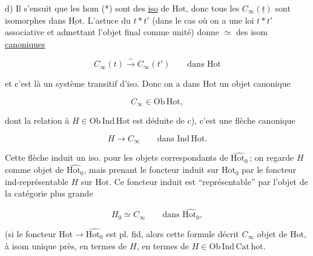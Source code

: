 
d) Il s'ensuit que les hom (*) sont des \uline{iso} de $\mathrm{Hot}$, donc tous les $C_\infty(\underline t)$ sont isomorphes dans $\underline{\mathrm{Hot}}$. L'astuce du $t*t'$ (dans le cas où on a une loi $t*t'$ associative et admettant l'objet final comme  unité) donne $\simeq$ des isom \uline{canoniques}

\[
C_\infty(t)\xrightarrow{\sim} C_\infty(t')\qquad\text{dans }\mathrm{Hot}
\]

et c'est là un système transitif d'iso. Donc on a dans $\mathrm{Hot}$ un objet  canonique

\[
C_\infty\in\mathrm{Ob}\,\mathrm{Hot},
\]

dont la relation à $H\in\mathrm{Ob}\,\mathrm{Ind\,Hot}$ est déduite de c), c'est une flèche canonique

\[
H\longrightarrow C_\infty\qquad\text{dans }\mathrm{Ind\,Hot}.
\]


Cette flèche induit un iso. pour les objets correspondants de $\widehat{\mathrm{Hot}_0}$\,;  on regarde $H$  comme  objet de $\widehat{\mathrm{Hot}_0}$, mais prenant le foncteur  induit sur $\mathrm{Hot}_0$ par le foncteur ind-représentable $H$ sur $\mathrm{Hot}$. Ce foncteur induit est ``représentable'' par l'objet  de la catégorie plus grande

\[
H_0\simeq C_\infty\qquad\text{dans }\widehat{\mathrm{Hot}_0},
\]

(si le foncteur  $\mathrm{Hot}\longrightarrow\widehat{\mathrm{Hot}_0}$ est pl. fid, alors cette formule décrit $C_\infty$  objet de $\mathrm{Hot}$, à isom unique près, en termes de $H$,   en termes de $H\in\mathrm{Ob}\,\mathrm{Ind\,Cat\,hot}$.

